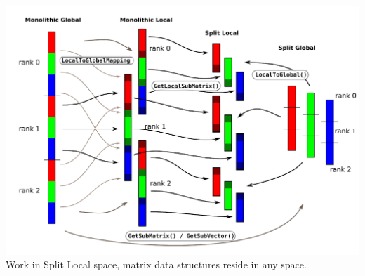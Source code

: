 \begin{frame}
  \includegraphics[width=\textwidth]{figures/PETSc/LocalSpaces} \\
  Work in Split Local space, matrix data structures reside in any space.
\end{frame}
